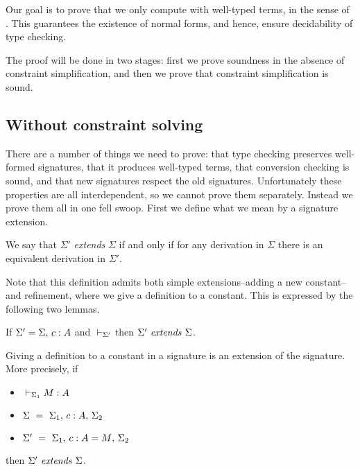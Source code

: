 
Our goal is to prove that we only compute with well-typed terms, in the sense
of {\Core}. This guarantees the existence of normal forms, and hence, ensure
decidability of type checking.

The proof will be done in two stages: first we prove soundness in the absence
of constraint simplification, and then we prove that constraint simplification
is sound.

\subsection{Without constraint solving}

There are a number of things we need to prove: that type checking preserves
well-formed signatures, that it produces well-typed terms, that conversion
checking is sound, and that new signatures respect the old signatures.
Unfortunately these properties are all interdependent, so we cannot prove them
separately. Instead we prove them all in one fell swoop. First we define what
we mean by a signature extension.

\begin{definition} \label{defSigExt}
    We say that $\Sigma'$ {\em extends} $\Sigma$ if and only if for any {\Core}
    derivation in $\Sigma$ there is an equivalent derivation in $\Sigma'$.
\end{definition}

Note that this definition admits both simple extensions--adding a new
constant--and refinement, where we give a definition to a constant. This is
expressed by the following two lemmas.

\begin{lemma} \label{lemWeakenSig}
    If $\Sigma' = {\Sigma},\,{} {c:A}$ and ${} \vdash_{\Sigma'}$ then ${\Sigma'} ~ \mathit{extends} ~ {\Sigma}$.
\end{lemma}

\begin{lemma} \label{lemRefineSig}
    Giving a definition to a constant in a signature is an extension of the
    signature. More precisely, if
    \begin{itemize}
	\item ${} \vdash_{\Sigma_1} {M} : {A}$
	\item $\Sigma ~ = ~ {\Sigma_1},\,{} {{c} : {A}},\,{} \Sigma_2$
	\item $\Sigma' ~ = ~ {\Sigma_1},\,{} {{c} : {A} = {M}},\,{} \Sigma_2$
    \end{itemize}
    then ${\Sigma'} ~ \mathit{extends} ~ {\Sigma}$.
\end{lemma}

